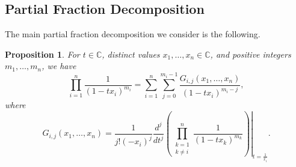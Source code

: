 \documentclass{amsart}
\newtheorem{proposition}[theorem]{Proposition}
\theoremstyle{definition}
\theoremstyle{remark}
\newcommand{\C}{\mathbb{C}}
\begin{document}

\subsection{Partial Fraction Decomposition}
\label{subsec:PartFrac}

The main partial fraction decomposition we consider is the following.

\begin{proposition}
\label{prop:PartFracGeneral}
For $t\in\C$, distinct values $x_1, \ldots, x_n \in \C$, and positive integers $m_1,\ldots, m_n$, we have
\begin{equation}
\label{eq:PartFracGeneral}
    \prod\limits_{i=1}^n \frac{1}{(1 - t x_i)^{m_i} }
    =
    \sum\limits_{i=1}^n \sum\limits_{j=0}^{m_i-1} \frac{ G_{i,j}(x_1,\ldots,x_n)}{(1 - t x_i)^{m_i - j} },
\end{equation}
where
\[
    G_{i,j}(x_1,\ldots,x_n) = \frac{1}{j! (-x_i)^j }
        \frac{d^j}{dt^j}\left.\left( \prod\limits_{\substack{k=1 \\ k\neq i}}^n
            \frac{1}{(1 - t x_k)^{m_k} }\right)\right|_{t= \frac{1}{x_i} } .
\]
\end{proposition}
\end{document}
